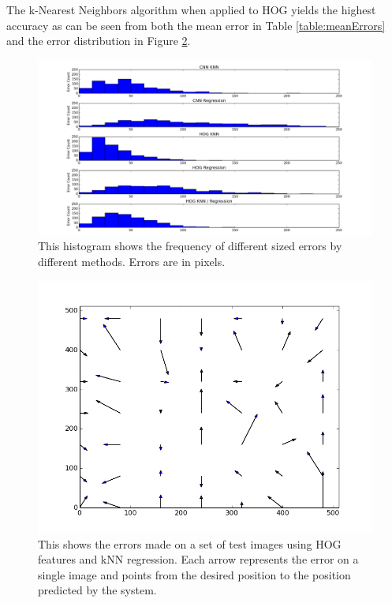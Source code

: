 \documentclass[10pt,twocolumn,letterpaper]{article}
\begin{document}
The k-Nearest Neighbors algorithm when applied to HOG yields the highest accuracy as can be seen from both the mean error in Table \ref{table:meanErrors} and the error distribution in Figure \ref{fig:hist}. 
 
\begin{figure}
	\begin{center}
		\includegraphics[width=0.9\linewidth]{figures/ClassifierErrorHist.png}
	\end{center}
	\caption{This histogram shows the frequency of different sized errors by different methods.  Errors are in pixels.}
	\label{fig:hist}
\end{figure}

\begin{figure}
		\includegraphics[width=0.9\linewidth]{figures/error_arrows.png}
	\caption{This shows the errors made on a set of test images using HOG features and kNN regression.  Each arrow represents the error on a single image and points from the desired position to the position predicted by the system.}
	\label{fig:hist}
\end{figure}
\end{document}
